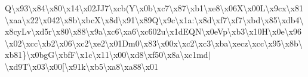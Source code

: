 \begin{DoxyCompactItemize}
Q\textbackslash{}x93\textbackslash{}x84\textbackslash{}x80\textbackslash{}x14\textbackslash{}x02\+J\+J7\textbackslash{}xcb(\+Y\textbackslash{}x0b\textquotesingle{}\textbackslash{}xc7\textbackslash{}x87\textbackslash{}xb1\textbackslash{}xe8\textbackslash{}x06\+X\textbackslash{}x00\+L\textbackslash{}x9cx\textbackslash{}x81\textbackslash{}xaa\textbackslash{}x22\textbackslash{}x042\textbackslash{}x8b\textbackslash{}xbc\+X\textbackslash{}x8d\textbackslash{}x91\textbackslash{}x89\+Q\textbackslash{}x9c\textbackslash{}x1a\+:\textbackslash{}x8d\textbackslash{}xf7\textbackslash{}xf7\textbackslash{}xbd\textbackslash{}x85\textbackslash{}xdb4\textbackslash{}x8cy\+Lv\textbackslash{}xd5r\textbackslash{}x80\textbackslash{}x88\textbackslash{}x9a\textbackslash{}xc6\textbackslash{}xa6\textbackslash{}xc602u\textbackslash{}x1d\+E\+Q\+N\textbackslash{}x0e\+Vp\textbackslash{}xb3\textbackslash{}x10\+H\textbackslash{}x0e\textbackslash{}x96\textbackslash{}x02\textbackslash{}xcc\textbackslash{}xb2\textbackslash{}x06\textbackslash{}xc2\textbackslash{}xe2\textbackslash{}x01\+Dm0\textbackslash{}x83\textbackslash{}x00x\textbackslash{}xc2\textbackslash{}xc3\textbackslash{}xba\textbackslash{}xecz\textbackslash{}xcc\textbackslash{}x95\textbackslash{}x8b\textbackslash{}xb81\}\textbackslash{}x0bg\+G\textbackslash{}xbf\+F\textbackslash{}x1c\textbackslash{}x11\textbackslash{}x00\textbackslash{}xd8\textbackslash{}xf50\textbackslash{}x8a\textbackslash{}xc1md$\vert$\textbackslash{}xd9\+T\textbackslash{}x03\textbackslash{}x00\mbox{[}\textbackslash{}x91k\textbackslash{}xb5\textbackslash{}xa8\textbackslash{}xa88\textbackslash{}x01 
\end{DoxyCompactItemize}
